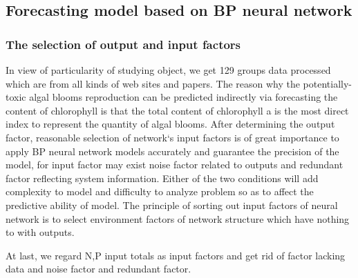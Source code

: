 \documentclass[12pt,a4paper]{article}
\begin{document}
\subsection{Forecasting model based on BP neural network}
\subsubsection{The selection of output and input factors}
In view of particularity of studying object, we get 129 groups data processed which are from all kinds of web sites and papers. The reason why the potentially-toxic algal blooms reproduction can be predicted indirectly via forecasting the content of chlorophyll is that the total content of chlorophyll a is the most direct index to represent the quantity of algal blooms. After determining the output factor, reasonable selection of network‘s input factors is of great importance to apply BP neural network models accurately and guarantee the precision of the model, for input factor may exist noise factor related to outputs and redundant factor reflecting system information. Either of the two conditions will add complexity to model and difficulty to analyze problem so as to affect the predictive ability of model. The principle of sorting out input factors of neural network is to select environment factors of network structure which have nothing to with outputs.\par
At last, we regard N,P input totals as input factors and get rid of factor lacking data and noise factor and redundant factor.\par

\end{document}
